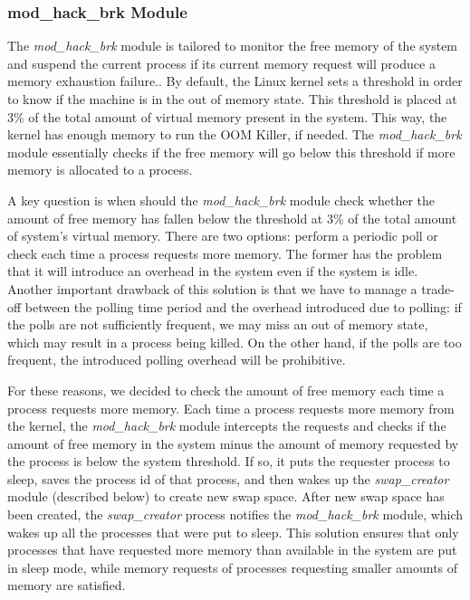 \subsubsection{mod\_hack\_brk Module}

The {\it mod\_hack\_brk} module is tailored to monitor the free memory
of the system and suspend the current process if its current memory request
will produce a memory exhaustion failure.. By default, the Linux kernel sets a threshold in order to know if the machine is in the out of memory state. This
threshold is placed at 3\% of the total amount of virtual memory present
in the system. This way, the kernel has enough memory to run the OOM Killer,
if needed. The {\it mod\_hack\_brk} module essentially checks if the free
memory will go below this threshold if more memory is allocated to a process.

A key question is when should the {\it mod\_hack\_brk} module check whether
the amount of free memory has fallen below the threshold at 3\% of the
total amount of system's virtual memory. There are two options:
perform a periodic poll or check each time a process
requests more memory. The former has the problem that it will introduce an
overhead in the system even if the system is idle. Another important
drawback of this solution is that we have to manage a trade-off between
the polling time period and the overhead introduced due to polling: if the
polls are not sufficiently frequent, we may miss an out of memory state,
which may result in a process being killed. On the other hand, if the polls
are too frequent, the introduced polling overhead will be prohibitive.

For these reasons, we decided to check the amount of free memory each time
a process requests more memory.
Each time a process requests more memory from the kernel, the
{\it mod\_hack\_brk} module intercepts the requests and checks if the
amount of free memory in the system minus the amount of memory requested
by the process is below the system threshold. If so, it puts the requester
process to sleep, saves the process id of that process, and then
wakes up the {\it swap\_creator} module (described below) to create new
swap space. After new swap space has been created, the {\it swap\_creator}
process notifies the {\it mod\_hack\_brk} module, which wakes up all the
processes that were put to sleep. This solution ensures that only processes
that have requested more memory than available in the system are put in
sleep mode, while memory requests of processes requesting smaller amounts
of memory are satisfied.

